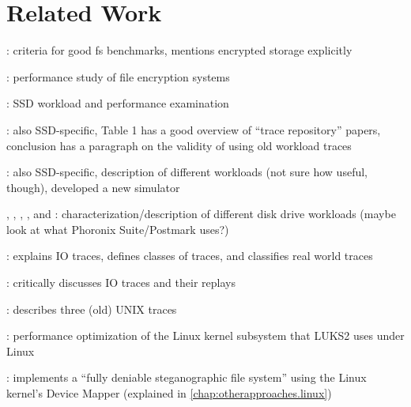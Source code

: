 \chapter{Related Work}
\label{chap:relatedwork}

\cite{Traeger2008}: criteria for good fs benchmarks, mentions encrypted storage explicitly

\cite{Wright2003}: performance study of file encryption systems

\cite{Agrawal2008}: SSD workload and performance examination

\cite{Yadgar2021}: also SSD-specific, Table 1 has a good overview of ``trace repository'' papers, conclusion has a paragraph on the validity of using old workload traces

\cite{He2017}: also SSD-specific, description of different workloads (not sure how useful, though), developed a new simulator

\cite{Riska2006}, \cite{Riska2006a}, \cite{Leung2008}, \cite{Riska2009}, and \cite{Sehgal2010}: characterization/description of different disk drive workloads (maybe look at what Phoronix Suite/Postmark uses?)

\cite{Seo2014}: explains IO traces, defines classes of traces, and classifies real world traces

\cite{Pereira2013}: critically discusses IO traces and their replays

\cite{Ruemmler1993}: describes three (old) UNIX traces

\cite{Korchagin2020}: performance optimization of the Linux kernel subsystem that LUKS2 uses under Linux

\cite{Barker2019}: implements a ``fully deniable steganographic file system'' using the Linux kernel's Device Mapper (explained in \autoref{chap:otherapproaches.linux})